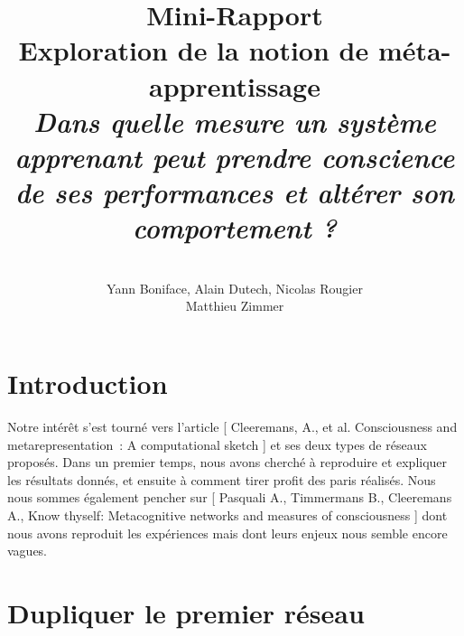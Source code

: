 \documentclass[a4paper,12pt]{article}
\title{
  \textbf{Mini-Rapport}
  \\[5cm]
  Exploration de la notion de méta-apprentissage
  \\[3cm]
  \textit{
  Dans quelle mesure un système apprenant peut prendre conscience de ses performances
  et altérer son comportement ?}
}
\author{
  \\[3cm]
  Yann Boniface, Alain Dutech, Nicolas Rougier \\
  Matthieu Zimmer}
\begin{document}
\maketitle








\newpage
\section{Introduction}

Notre intérêt s'est tourné vers l'article [ Cleeremans, A., et al. Consciousness and 
metarepresentation : A computational sketch ] et ses deux types de réseaux proposés.
Dans un premier temps, nous avons cherché à reproduire et expliquer les résultats
donnés, et ensuite à comment tirer profit des paris réalisés.
\newline
Nous nous sommes également pencher sur [ Pasquali A., Timmermans B., Cleeremans A., Know
thyself: Metacognitive networks and measures of consciousness ] dont nous avons reproduit
les expériences mais dont leurs enjeux nous semble encore vagues.


\section{Dupliquer le premier réseau}
\end{document}
